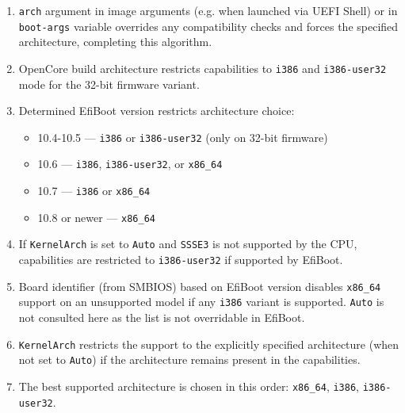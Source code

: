 \documentclass[]{article}
\providecommand{\tightlist}{%
  \setlength{\itemsep}{0pt}\setlength{\parskip}{0pt}}
\begin{document}
\begin{enumerate}
  \begin{enumerate}
    \tightlist
    \item \texttt{arch} argument in image arguments (e.g. when launched
    via UEFI Shell) or in \texttt{boot-args} variable overrides any compatibility
    checks and forces the specified architecture, completing this algorithm.
    \item OpenCore build architecture restricts capabilities to \texttt{i386}
      and \texttt{i386-user32} mode for the 32-bit firmware variant.
    \item Determined EfiBoot version restricts architecture choice:
      \begin{itemize}
      \item 10.4-10.5 --- \texttt{i386} or \texttt{i386-user32} (only on 32-bit firmware)
      \item 10.6 --- \texttt{i386}, \texttt{i386-user32}, or \texttt{x86\_64}
      \item 10.7 --- \texttt{i386} or \texttt{x86\_64}
      \item 10.8 or newer --- \texttt{x86\_64}
      \end{itemize}
    \item If \texttt{KernelArch} is set to \texttt{Auto} and \texttt{SSSE3}
      is not supported by the CPU, capabilities are restricted to \texttt{i386-user32}
      if supported by EfiBoot.
    \item Board identifier (from SMBIOS) based on EfiBoot version
      disables \texttt{x86\_64} support on an unsupported model
      if any \texttt{i386} variant is supported. \texttt{Auto}
      is not consulted here as the list is not overridable in EfiBoot.
    \item \texttt{KernelArch} restricts the support to the explicitly
      specified architecture (when not set to \texttt{Auto}) if
      the architecture remains present in the capabilities.
    \item The best supported architecture is chosen in this order:
      \texttt{x86\_64}, \texttt{i386}, \texttt{i386-user32}.
  \end{enumerate}


\end{enumerate}
\end{document}
